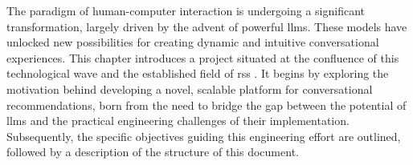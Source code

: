 The paradigm of human-computer interaction is undergoing a significant transformation, largely driven by the advent of powerful \acp{llm}. These models have unlocked new possibilities for creating dynamic and intuitive conversational experiences. This chapter introduces a project situated at the confluence of this technological wave and the established field of \acl{rs}s \cite{BOOK:RS-HANDBOOK}. It begins by exploring the motivation behind developing a novel, scalable platform for conversational recommendations, born from the need to bridge the gap between the potential of \acp{llm} and the practical engineering challenges of their implementation. Subsequently, the specific objectives guiding this engineering effort are outlined, followed by a description of the structure of this document.